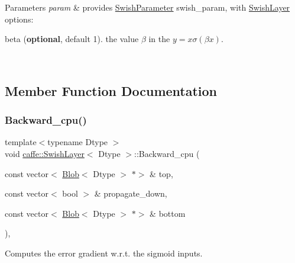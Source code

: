\begin{DoxyParams}{Parameters}
{\em param} & provides \mbox{\hyperlink{classcaffe_1_1_swish_parameter}{Swish\+Parameter}} swish\+\_\+param, with \mbox{\hyperlink{classcaffe_1_1_swish_layer}{Swish\+Layer}} options\+:
\begin{DoxyItemize}
\item beta ({\bfseries optional}, default 1). the value $ \beta $ in the $ y = x \sigma (\beta x) $. 
\end{DoxyItemize}\\
\hline
\end{DoxyParams}


\subsection{Member Function Documentation}
\mbox{\label{classcaffe_1_1_swish_layer_a4e6fe81fa5ed75a96ab58a07d2ff9e6c}} 
\subsubsection{\texorpdfstring{Backward\+\_\+cpu()}{Backward\_cpu()}\hspace{0.1cm}{\footnotesize\ttfamily [1/2]}}
{\footnotesize\ttfamily template$<$typename Dtype $>$ \\
void \mbox{\hyperlink{classcaffe_1_1_swish_layer}{caffe\+::\+Swish\+Layer}}$<$ Dtype $>$\+::Backward\+\_\+cpu (\begin{DoxyParamCaption}\item[{const vector$<$ \mbox{\hyperlink{classcaffe_1_1_blob}{Blob}}$<$ Dtype $>$ $\ast$$>$ \&}]{top,  }\item[{const vector$<$ bool $>$ \&}]{propagate\+\_\+down,  }\item[{const vector$<$ \mbox{\hyperlink{classcaffe_1_1_blob}{Blob}}$<$ Dtype $>$ $\ast$$>$ \&}]{bottom }\end{DoxyParamCaption})\hspace{0.3cm}{\ttfamily [protected]}, {\ttfamily [virtual]}}



Computes the error gradient w.\+r.\+t. the sigmoid inputs. 


